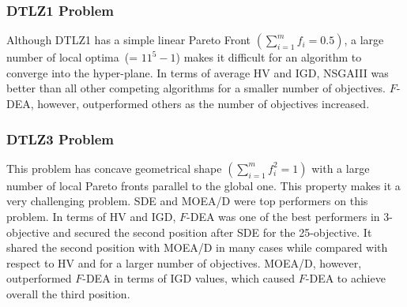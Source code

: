 \documentclass[review]{elsarticle}
\begin{document}

\subsubsection{DTLZ1 Problem}

Although DTLZ1 has a simple linear Pareto Front $(\sum_{i=1}^{m} f_i=0.5)$, a large number of local optima~(= $11^5-1$)   
makes it difficult for an algorithm to converge into the hyper-plane. In terms of average HV and IGD,
NSGAIII was better than all other competing algorithms for a smaller number of objectives.
$F$-DEA, however, outperformed others as the number of objectives increased.



\subsubsection{DTLZ3 Problem}

This problem has concave geometrical shape $(\sum_{i=1}^{m} f^2_i=1)$ with a large number of local Pareto fronts parallel to the global one. This property makes it a very challenging problem. SDE and MOEA/D were top performers on this problem. %
In terms of HV and IGD, $F$-DEA was one of  the best performers in 3-objective 
and secured the second position after SDE for the 25-objective. 
It shared the second position with MOEA/D in many cases while compared with respect to HV and for a larger number of objectives.  
MOEA/D, however, outperformed $F$-DEA in terms of IGD values, which caused $F$-DEA to achieve overall the third position.
\end{document}
